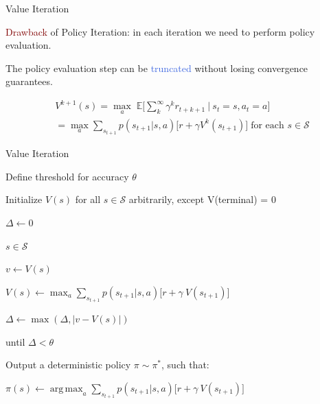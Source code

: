 \documentclass{beamer}
\DeclareMathOperator*{\argmax}{arg\,max}
\begin{document}
\begin{frame}{Value Iteration}

\textcolor{Maroon}{Drawback} of Policy Iteration: in each iteration we need to perform policy evaluation.

\vspace{2mm}

The policy evaluation step can be \textcolor{RoyalBlue}{truncated} without losing convergence guarantees.

\begin{align*}
    &V^{k+1}(s) = \max_a \;  \mathds{E} \bigg[\sum_{k}^{\infty}\gamma^{k} r_{t+k+1} \: \bigg| \: s_t=s, a_t = a \bigg] \\
		   & = \max_a \sum_{s_{t+1}} p(s_{t+1}|s,a)\big[r + \gamma V^{k}(s_{t+1}) \big] \; \text{for each } s \in \mathcal{S}
\end{align*}


\end{frame}


\begin{frame}{Value Iteration}


\begin{algorithm}[H]
\caption{Value Iteration Algorithm}


\vspace{1mm}

Define threshold for accuracy $\theta$

Initialize $V(s)$ for all $s \in \mathcal{S}$ arbitrarily, except V(terminal) = 0

\vspace{4mm}

 $\Delta \leftarrow 0$

 \textbf{}  \textbf{}
 
 \vspace{0.5mm}
 
 \hspace{6mm} \textbf{}  $s \in \mathcal{S}$ \textbf{}
 
   
   \hspace{15mm} $v \leftarrow V(s)$
   
   \hspace{15mm} $V(s) \leftarrow \max_a \sum_{s_{t+1}}p(s_{t+1}|s,a)\Big[r+\gamma\:V(s_{t+1})\Big]$
   
   \hspace{15mm} $\Delta \leftarrow \max(\Delta, |v - V(s)|)$
   
   until $\Delta < \theta$

   \vspace{4mm}

   Output a deterministic policy $\pi \sim \pi^{*}$, such that:
   
   $\pi(s) \leftarrow \argmax_a \sum_{s_{t+1}}p(s_{t+1}|s,a)\Big[r+\gamma\:V(s_{t+1})\Big]$
   

\end{algorithm}

\end{frame}
\end{document}
